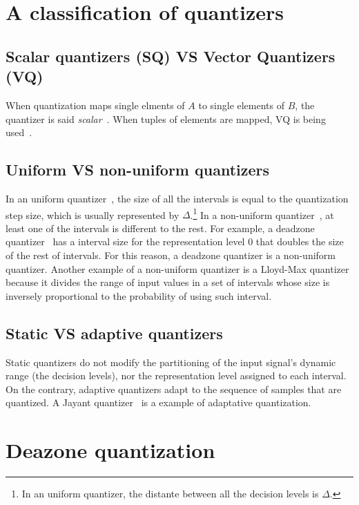 \section{A classification of quantizers}

\subsection{Scalar quantizers (SQ) VS Vector Quantizers (VQ)}

When quantization maps single elments of $A$ to single elements of
$B$, the quantizer is said
\emph{scalar}~\cite{vruiz__scalar_quantization}. When tuples of
elements are mapped, VQ is being
used~\cite{vruiz__vector_quantization}.

\subsection{Uniform VS non-uniform quantizers}

In an uniform quantizer~\cite{vruiz__scalar_quantization}, the size of
all the intervals is equal to the quantization step size, which is
usually represented by $\Delta$.\footnote{In an uniform quantizer, the
distante between all the decision levels is $\Delta$.} In a
non-uniform quantizer~\cite{vruiz__scalar_quantization}, at least one
of the intervals is different to the rest. For example, a deadzone
quantizer~\cite{vruiz__scalar_quantization} has a interval size for
the representation level 0 that doubles the size of the rest of
intervals. For this reason, a deadzone quantizer is a non-uniform
quantizer. Another example of a non-uniform quantizer is a Lloyd-Max
quantizer because it divides the range of input values in a set of
intervals whose size is inversely proportional to the probability of
using such interval.

\subsection{Static VS adaptive quantizers}

Static quantizers do not modify the partitioning of the input signal's
dynamic range (the decision levels), nor the representation level
assigned to each interval. On the contrary, adaptive quantizers adapt
to the sequence of samples that are quantized. A Jayant
quantizer~\cite{vruiz__scalar_quantization} is a example of adaptative
quantization.

\section{Deazone quantization}

